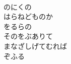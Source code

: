 \documentclass[10pt,b5j]{tarticle} %
\begin{document}
\begin{enumerate}
\begin{minipage}[c]{\blocksize}
        \vspace{\linespace}
        \item~\\
        のにくの\\
        はらねどものか\\
        をるらの\\
        そのをぶありて\\
        まなざしげてむれば\\
        ぞふる
    
    \end{minipage}
\end{enumerate} %
\end{document}
